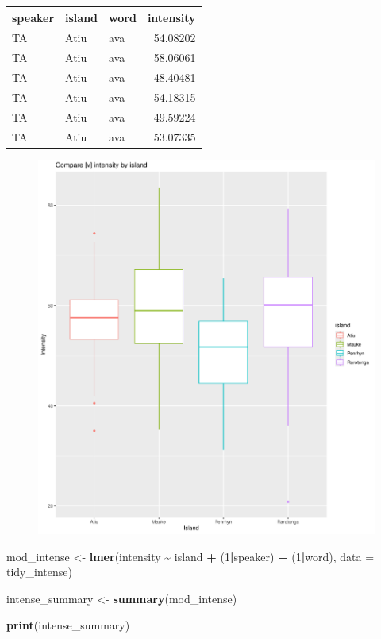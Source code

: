 \documentclass[
  ,man,floatsintext]{apa6}
\newenvironment{Shaded}{\begin{snugshade}}{\end{snugshade}}
\newcommand{\AttributeTok}[1]{\textcolor[rgb]{0.13,0.29,0.53}{#1}}
\newcommand{\DecValTok}[1]{\textcolor[rgb]{0.00,0.00,0.81}{#1}}
\newcommand{\FunctionTok}[1]{\textcolor[rgb]{0.13,0.29,0.53}{\textbf{#1}}}
\newcommand{\NormalTok}[1]{#1}
\newcommand{\OtherTok}[1]{\textcolor[rgb]{0.56,0.35,0.01}{#1}}
\newcommand{\SpecialCharTok}[1]{\textcolor[rgb]{0.81,0.36,0.00}{\textbf{#1}}}
\begin{document}
\begin{tabular}{l|l|l|r}
\hline
speaker & island & word & intensity\\
\hline
TA & Atiu & ava & 54.08202\\
\hline
TA & Atiu & ava & 58.06061\\
\hline
TA & Atiu & ava & 48.40481\\
\hline
TA & Atiu & ava & 54.18315\\
\hline
TA & Atiu & ava & 49.59224\\
\hline
TA & Atiu & ava & 53.07335\\
\hline
\end{tabular}

\begin{figure}
\includegraphics[width=2700px]{D2_CIM_files/figure-latex/print-intensity-plot-1} \caption{ }\label{fig:print-intensity-plot}
\end{figure}

\begin{Shaded}
\begin{Highlighting}[]
\NormalTok{mod\_intense }\OtherTok{\textless{}{-}} \FunctionTok{lmer}\NormalTok{(intensity }\SpecialCharTok{\textasciitilde{}}\NormalTok{ island }\SpecialCharTok{+}\NormalTok{ (}\DecValTok{1}\SpecialCharTok{|}\NormalTok{speaker) }\SpecialCharTok{+}\NormalTok{ (}\DecValTok{1}\SpecialCharTok{|}\NormalTok{word), }\AttributeTok{data =}\NormalTok{ tidy\_intense)}

\NormalTok{intense\_summary }\OtherTok{\textless{}{-}} \FunctionTok{summary}\NormalTok{(mod\_intense)}

\FunctionTok{print}\NormalTok{(intense\_summary)}
\end{Highlighting}
\end{Shaded}
\end{document}
